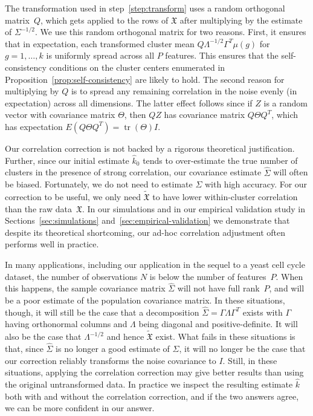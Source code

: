 \documentclass[12pt]{article}
\DeclareMathOperator*{\tr}{tr}
\newcommand{\T}{T}
\newcommand{\dataX}{\mathfrak{X}}
\begin{document}
The transformation used in step~\ref{step:transform} uses a random orthogonal
matrix~$Q$, which gets applied to the rows of $\dataX$ after 
multiplying by the estimate of $\Sigma^{-1/2}$. We use this random orthogonal
matrix for two reasons. First, it ensures that in expectation, each transformed cluster mean
$Q \Lambda^{-1/2} \Gamma^\T \mu(g)$ for $g = 1, \dotsc, k$ is uniformly
spread across all $P$ features. This ensures that the self-consistency
conditions on the cluster centers enumerated in Proposition~\ref{prop:self-consistency}
are likely to hold. The second reason for multiplying by $Q$ is to spread any
remaining correlation in the noise evenly (in expectation) across all
dimensions. The latter effect follows since if $Z$ is a random vector with
covariance matrix $\Theta$, then $Q Z$ has covariance matrix $Q \Theta Q^\T$,
which has expectation $E(Q \Theta Q^\T) = \tr(\Theta) I$.


Our correlation correction is not backed by a rigorous theoretical
justification. Further, since our initial estimate $\hat k_0$ tends to
over-estimate the true number of clusters in the presence of strong
correlation, our covariance estimate $\hat \Sigma$ will often be biased.
Fortunately, we do not need to estimate $\Sigma$ with high accuracy. For our
correction to be useful, we only need $\tilde{\dataX}$ to have lower
within-cluster correlation than the raw data~$\dataX$. In our simulations and
in our empirical validation study in Sections~\ref{sec:simulations}
and~\ref{sec:empirical-validation} we demonstrate that despite its theoretical
shortcoming, our ad-hoc correlation adjustment often performs well in
practice.


In many applications, including our application in the sequel to a yeast cell
cycle dataset, the number of observations $N$ is below the number of
features~$P$. When this happens, the sample covariance matrix $\hat \Sigma$
will not have full rank~$P$, and will be a poor estimate of the population
covariance matrix. In these situations, though, it will still be the case that
a decomposition $\hat \Sigma = \Gamma \Lambda \Gamma^\T$ exists with $\Gamma$
having orthonormal columns and $\Lambda$ being diagonal and positive-definite.
It will also be the case that $\Lambda^{-1/2}$ and hence $\tilde{\dataX}$
exist. What fails in these situations is that, since $\hat \Sigma$ is no longer
a good estimate of $\Sigma$, it will no longer be the case that our correction
reliably transforms the noise covariance to $I$. Still, in these situations,
applying the correlation correction may give better results than using the
original untransformed data. In practice we inspect the resulting estimate
$\hat k$ both with and without the correlation correction, and if the two
answers agree, we can be more confident in our answer.
\end{document}
